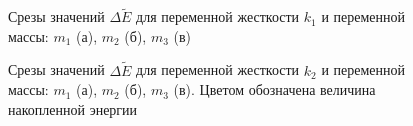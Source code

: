 \begin{figure}[b!]
    \begin{minipage}[h]{0.3\linewidth}
    \end{minipage}
    \hfill
    \begin{minipage}[h]{0.3\linewidth}
    \end{minipage}
    \begin{minipage}[h]{0.3\linewidth}
    \end{minipage}
    \caption{Срезы значений $\Delta \tilde{E}$ для переменной жесткости $k_1$ и переменной массы: $m_1$ (а), $m_2$ (б), $m_3$ (в)}
    \label{fig:var2k1}
\end{figure}


\begin{figure}[b!]
    \begin{minipage}[h]{0.3\linewidth}
    \end{minipage}
    \hfill
    \begin{minipage}[h]{0.3\linewidth}
    \end{minipage}
    \begin{minipage}[h]{0.3\linewidth}
    \end{minipage}
    \caption{Срезы значений $\Delta \tilde{E}$ для переменной жесткости $k_2$ и переменной массы: $m_1$ (а), $m_2$ (б), $m_3$ (в). Цветом обозначена величина накопленной энергии}
    \label{fig:var2k2}
\end{figure}


